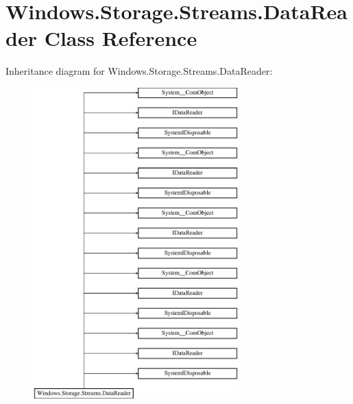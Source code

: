 \hypertarget{class_windows_1_1_storage_1_1_streams_1_1_data_reader}{}\section{Windows.\+Storage.\+Streams.\+Data\+Reader Class Reference}
\label{class_windows_1_1_storage_1_1_streams_1_1_data_reader}
Inheritance diagram for Windows.\+Storage.\+Streams.\+Data\+Reader\+:\begin{figure}[H]
\begin{center}
\leavevmode
\includegraphics[height=12.000000cm]{class_windows_1_1_storage_1_1_streams_1_1_data_reader}
\end{center}
\end{figure}
